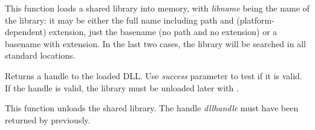 This function loads a shared library into memory, with {\it libname} being the
name of the library: it may be either the full name including path and
(platform-dependent) extension, just the basename (no path and no extension)
or a basename with extension. In the last two cases, the library will be
searched in all standard locations.

Returns a handle to the loaded DLL. Use {\it success} parameter to test if it
is valid. If the handle is valid, the library must be unloaded later with 
.




\label{wxdllloaderunloadlibrary}


This function unloads the shared library. The handle {\it dllhandle} must have
been returned by  previously.

